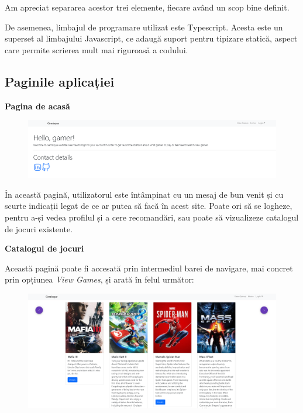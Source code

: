 \documentclass[12pt,a4paper]{report}
\begin{document}
Am apreciat separarea acestor trei elemente, fiecare având un scop bine definit.

De asemenea, limbajul de programare utilizat este Typescript. Acesta este un superset al limbajului Javascript, ce adaugă suport pentru tipizare statică, aspect care permite scrierea mult mai riguroasă a codului.

\subsection{Paginile aplicației}

\bigskip
\textbf{Pagina de acasă}
\bigskip

\begin{figure}[H]
\centering
\caption{}
\begin{adjustbox}{max size={\textwidth}{\textheight}}
\includegraphics{exemplu_30_home_page}
\end{adjustbox}

\caption*{}
\end{figure}

În această pagină, utilizatorul este întâmpinat cu un mesaj de bun venit și cu scurte indicații legat de ce ar putea să facă în acest site. Poate ori să se logheze, pentru a-și  vedea profilul și a cere recomandări, sau poate să vizualizeze catalogul de jocuri existente.

\bigskip
\textbf{Catalogul de jocuri}
\bigskip

Această pagină poate fi accesată prin intermediul barei de navigare, mai concret prin opțiunea \emph{View Games}, și arată în felul următor:

\begin{figure}[H]
\centering
\caption{}
\begin{adjustbox}{max size={\textwidth}{\textheight}}
\includegraphics{exemplu_31_games_catalog}
\end{adjustbox}

\caption*{}
\end{figure}
\end{document}
